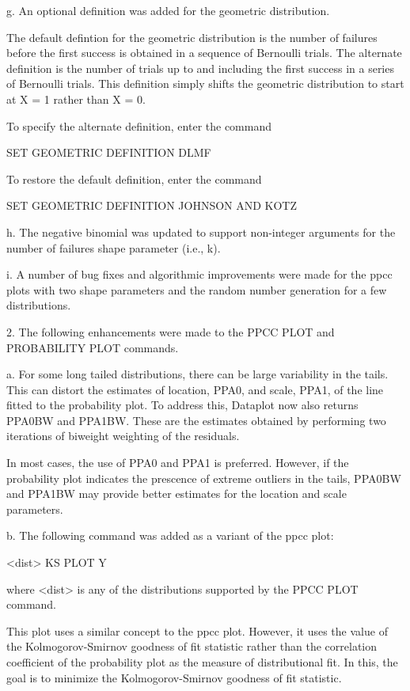 {    g. An optional definition was added for the geometric
       distribution.

       The default defintion for the geometric distribution is the
       number of failures before the first success is obtained in
       a sequence of Bernoulli trials.  The alternate definition
       is the number of trials up to and including the first
       success in a series of Bernoulli trials.  This definition
       simply shifts the geometric distribution to start at X = 1
       rather than X = 0.

       To specify the alternate definition, enter the command

          SET GEOMETRIC DEFINITION DLMF

       To restore the default definition, enter the command

          SET GEOMETRIC DEFINITION JOHNSON AND KOTZ

    h. The negative binomial was updated to support non-integer
       arguments for the number of failures shape parameter
       (i.e., k).

    i. A number of bug fixes and algorithmic improvements were made
       for the ppcc plots with two shape parameters and the random
       number generation for a few distributions.

 2. The following enhancements were made to the PPCC PLOT and
    PROBABILITY PLOT commands.

    a. For some long tailed distributions, there can be large
       variability in the tails.  This can distort the estimates
       of location, PPA0,  and scale, PPA1, of the line fitted
       to the probability plot.  To address this, Dataplot now
       also returns PPA0BW and PPA1BW.  These are the estimates
       obtained by performing two iterations of biweight
       weighting of the residuals.

       In most cases, the use of PPA0 and PPA1 is preferred.
       However, if the probability plot indicates the prescence
       of extreme outliers in the tails, PPA0BW and PPA1BW may
       provide better estimates for the location and scale
       parameters.

    b. The following command was added as a variant of the
       ppcc plot:

          <dist> KS PLOT Y

       where <dist> is any of the distributions supported by
       the PPCC PLOT command.

       This plot uses a similar concept to the ppcc plot.
       However, it uses the value of the Kolmogorov-Smirnov
       goodness of fit statistic rather than the correlation
       coefficient of the probability plot as the measure 
       of distributional fit.  In this, the goal is to minimize
       the Kolmogorov-Smirnov goodness of fit statistic.

}
